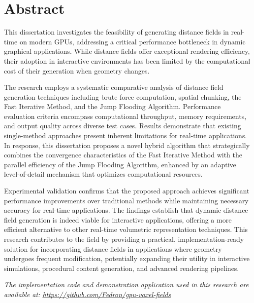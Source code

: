 \chapter*{Abstract}

This dissertation investigates the feasibility of generating distance fields in real-time on modern GPUs, addressing a
critical performance bottleneck in dynamic graphical applications. While distance fields offer exceptional rendering
efficiency, their adoption in interactive environments has been limited by the computational cost of their generation
when geometry changes.

The research employs a systematic comparative analysis of distance field generation techniques including brute force
computation, spatial chunking, the Fast Iterative Method, and the Jump Flooding Algorithm. Performance evaluation
criteria encompass computational throughput, memory requirements, and output quality across diverse test cases. Results
demonstrate that existing single-method approaches present inherent limitations for real-time applications. In response,
this dissertation proposes a novel hybrid algorithm that strategically combines the convergence characteristics of the
Fast Iterative Method with the parallel efficiency of the Jump Flooding Algorithm, enhanced by an adaptive
level-of-detail mechanism that optimizes computational resources.

Experimental validation confirms that the proposed approach achieves significant performance improvements over
traditional methods while maintaining necessary accuracy for real-time applications. The findings establish that dynamic
distance field generation is indeed viable for interactive applications, offering a more efficient alternative to other
real-time volumetric representation techniques. This research contributes to the field by providing a practical,
implementation-ready solution for incorporating distance fields in applications where geometry undergoes frequent
modification, potentially expanding their utility in interactive simulations, procedural content generation, and
advanced rendering pipelines.

\begin{center}
    \textit{The implementation code and demonstration application used in this research are available at: \url{https://github.com/Fedron/gpu-voxel-fields}}
\end{center}
